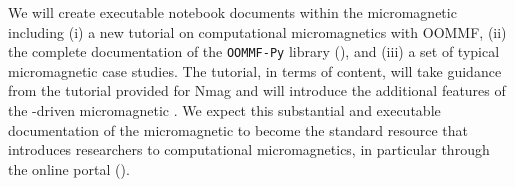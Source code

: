 \begin{workpackage}
\begin{tasklist}
\begin{task}[lead=XFEL,title=Demonstrator: micromagnetic VRE notebooks,
  id=oommf-tutorial-and-documentation,PM=6,partners={SR,PS,USO},wphases=19-25,issue=81]
  We will create executable notebook documents
  within the micromagnetic \VRE
  including (i) a new tutorial on computational micromagnetics with
  OOMMF, (ii) the complete documentation of the \texttt{OOMMF-Py}
  library (),
  and (iii) a set of typical micromagnetic case studies. The tutorial,
  in terms of content, will take guidance from the tutorial provided
  for Nmag \cite{Nmag-tutorial-url} and will introduce the additional
  features of the \Jupyter-driven micromagnetic \VRE. We expect this
  substantial and executable documentation of the micromagnetic \VRE to
  become the standard resource that introduces researchers to
  computational micromagnetics, in particular through the online
  portal ().

\end{task}


\end{tasklist}
\end{workpackage}
